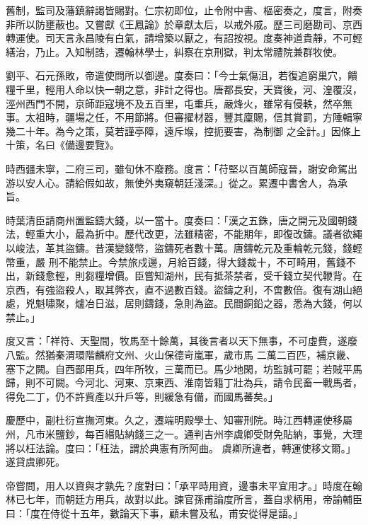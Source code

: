 \begin{pinyinscope}
 舊制，監司及藩鎮辭謁皆賜對。仁宗初即位，止令附中書、樞密奏之，度言，附奏非所以防壅蔽也。又嘗獻《王鳳論》於章獻太后，以戒外戚。歷三司磨勘司、京西轉運使。司天言永昌陵有白氣，請增築以厭之，有詔按視。度奏神道貴靜，不可輕
 繕治，乃止。入知制誥，遷翰林學士，糾察在京刑獄，判太常禮院兼群牧使。



 劉平、石元孫敗，帝遣使問所以御邊。度奏曰：「今士氣傷沮，若復追窮巢穴，饋糧千里，輕用人命以快一朝之意，非計之得也。唐都長安，天寶後，河、湟覆沒，涇州西門不開，京師距寇境不及五百里，屯重兵，嚴烽火，雖常有侵軼，然卒無事。太祖時，疆場之任，不用節將。但審擢材器，豐其廩賜，信其賞罰，方陲輯寧幾二十年。為今之策，莫若謹亭障，遠斥堠，控扼要害，為制御
 之全計。」因條上十策，名曰《備邊要覽》。



 時西疆未寧，二府三司，雖旬休不廢務。度言：「苻堅以百萬師寇晉，謝安命駕出游以安人心。請給假如故，無使外夷窺朝廷淺深。」從之。累遷中書舍人，為承旨。



 時葉清臣請商州置監鑄大錢，以一當十。度奏曰：「漢之五銖，唐之開元及國朝錢法，輕重大小，最為折中。歷代改更，法雖精密，不能期年，即復改鑄。議者欲繩以峻法，革其盜鑄。昔漢變錢幣，盜鑄死者數十萬。唐鑄乾元及重輪乾元錢，錢輕幣重，嚴
 刑不能禁止。今禁旅戍邊，月給百錢，得大錢裁十，不可畸用，舊錢不出，新錢愈輕，則芻糧增價。臣嘗知湖州，民有抵茶禁者，受千錢立契代鞭背。在京西，有強盜殺人，取其弊衣，直不過數百錢。盜鑄之利，不啻數倍。復有湖山絕處，兇魁嘯聚，爐冶日滋，居則鑄錢，急則為盜。民間銅鉛之器，悉為大錢，何以禁止。」



 度又言：「祥符、天聖間，牧馬至十餘萬，其後言者以天下無事，不可虛費，遂廢八監。然猶秦渭環階麟府文州、火山保德岢嵐軍，歲市馬
 二萬二百匹，補京畿、塞下之闕。自西鄙用兵，四年所牧，三萬而已。馬少地閑，坊監誠可罷；若賊平馬歸，則不可闕。今河北、河東、京東西、淮南皆籍丁壯為兵，請令民畜一戰馬者，得免二丁，仍不許貲產以升戶等，則緩急有備，而國馬蕃矣。」



 慶歷中，副杜衍宣撫河東。久之，遷端明殿學士、知審刑院。時江西轉運使移屬州，凡市米鹽鈔，每百緡貼納錢三之一。通判吉州李虞卿受財免貼納，事覺，大理將以枉法論。度曰：「枉法，謂於典憲有所阿曲。
 虞卿所違者，轉運使移文爾。」遂貸虞卿死。



 帝嘗問，用人以資與才孰先？度對曰：「承平時用資，邊事未平宜用才。」時度在翰林已七年，而朝廷方用兵，故對以此。諫官孫甫論度所言，蓋自求柄用，帝諭輔臣曰：「度在侍從十五年，數論天下事，顧未嘗及私，甫安從得是語。」




\end{pinyinscope}
